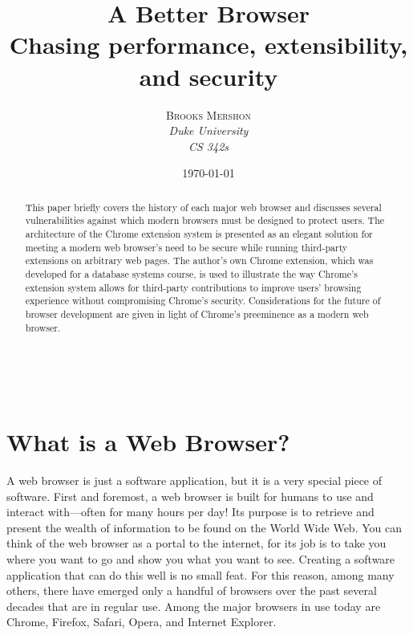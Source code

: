 \documentclass[a4paper, 11pt]{article} %
\title{\textbf{A Better Browser}\\ %
Chasing performance, extensibility, and security} %
\author{\textsc{Brooks Mershon} %
\\{\textit{Duke University}} %
\\{\textit{CS 342s}}} %
\date{\today} %
\makeatletter
\renewcommand{\maketitle}{ %
\begin{flushright} %
{\LARGE\@title} %

\vspace{50pt} %

{\large\@author} %
\\\@date %

\end{flushright}
}
\makeatother
\begin{document}
\maketitle %






\begin{abstract}
	This paper briefly covers the history of each major web browser and discusses several vulnerabilities against which modern browsers must be designed to protect users. The architecture of the Chrome extension system is presented as an elegant solution for meeting a modern web browser's need to be secure while running third-party extensions on arbitrary web pages. The author's own Chrome extension, which was developed for a database systems course, is used to illustrate the way Chrome's extension system allows for third-party contributions to improve users' browsing experience without compromising Chrome's security. Considerations for the future of browser development are given in light of Chrome's preeminence as a modern web browser.
\end{abstract}

\eject

\tableofcontents

\eject

\section{What is a Web Browser? }

A web browser is just a software application, but it is a very special piece of software. First and foremost, a web browser is built for humans to use and interact with---often for many hours per day! Its purpose is to retrieve and present the wealth of information to be found on the World Wide Web. You can think of the web browser as a portal to the internet, for its job is to take you where you want to go and show you what you want to see. Creating a software application that can do this well is no small feat. For this reason, among many others, there have emerged only a handful of browsers over the past several decades that are in regular use. Among the major browsers in use today are Chrome, Firefox, Safari, Opera, and Internet Explorer.
\end{document}
